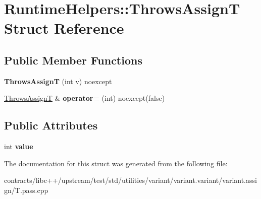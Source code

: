\hypertarget{struct_runtime_helpers_1_1_throws_assign_t}{}\section{Runtime\+Helpers\+:\+:Throws\+AssignT Struct Reference}
\label{struct_runtime_helpers_1_1_throws_assign_t}
\subsection*{Public Member Functions}
\begin{DoxyCompactItemize}
\item 
\mbox{\label{struct_runtime_helpers_1_1_throws_assign_t_a7da1f6fe4f7a92a86a37defffd6e5b22}} 
{\bfseries Throws\+AssignT} (int v) noexcept
\item 
\mbox{\label{struct_runtime_helpers_1_1_throws_assign_t_a1d789ed8a8c691bc0520952b711ff6f8}} 
\mbox{\hyperlink{struct_runtime_helpers_1_1_throws_assign_t}{Throws\+AssignT}} \& {\bfseries operator=} (int) noexcept(false)
\end{DoxyCompactItemize}
\subsection*{Public Attributes}
\begin{DoxyCompactItemize}
\item 
\mbox{\label{struct_runtime_helpers_1_1_throws_assign_t_a613841afb705a4cd4b32265a97a2f150}} 
int {\bfseries value}
\end{DoxyCompactItemize}


The documentation for this struct was generated from the following file\+:\begin{DoxyCompactItemize}
\item 
contracts/libc++/upstream/test/std/utilities/variant/variant.\+variant/variant.\+assign/T.\+pass.\+cpp\end{DoxyCompactItemize}
